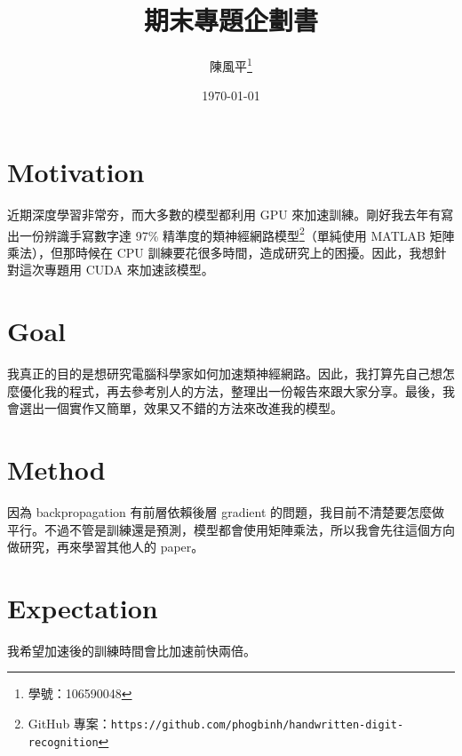 \documentclass[11pt, letterpaper, oneside]{article}
\title{\textbf{期末專題企劃書}}
\author{陳風平\thanks{學號：106590048}}
\affil{資訊工程系、國立台北科技大學、台北}
\date{\today}
\begin{document}
\maketitle

\section{Motivation}
近期深度學習非常夯，而大多數的模型都利用 GPU 來加速訓練。剛好我去年有寫出一份辨識手寫數字達 97\% 精準度的類神經網路模型\footnote{GitHub 專案：\texttt{https://github.com/phogbinh/handwritten-digit-recognition}}（單純使用 MATLAB 矩陣乘法），但那時候在 CPU 訓練要花很多時間，造成研究上的困擾。因此，我想針對這次專題用 CUDA 來加速該模型。

\section{Goal}
我真正的目的是想研究電腦科學家如何加速類神經網路。因此，我打算先自己想怎麼優化我的程式，再去參考別人的方法，整理出一份報告來跟大家分享。最後，我會選出一個實作又簡單，效果又不錯的方法來改進我的模型。

\section{Method}
因為 backpropagation 有前層依賴後層 gradient 的問題，我目前不清楚要怎麼做平行。不過不管是訓練還是預測，模型都會使用矩陣乘法，所以我會先往這個方向做研究，再來學習其他人的 paper。

\section{Expectation}
我希望加速後的訓練時間會比加速前快兩倍。
\end{document}
